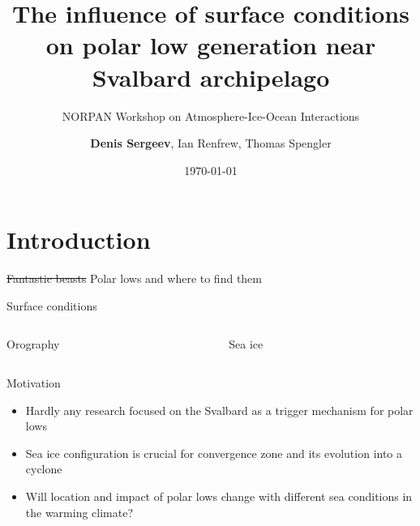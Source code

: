 \documentclass[10pt]{beamer}
\title{The influence of surface conditions on polar low generation near Svalbard archipelago}
\subtitle{\small{NORPAN Workshop on Atmosphere-Ice-Ocean Interactions}}
\date{\today}
\author{\textbf{Denis Sergeev}, Ian Renfrew, Thomas Spengler}
\begin{document}
\maketitle


\section{Introduction}
\begin{frame}{\sout{Fantastic beasts} Polar lows and where to find them}

\end{frame}

\begin{frame}{Surface conditions}
\begin{columns}
\begin{column}{0.5\textwidth}
Orography
\end{column}
\begin{column}{0.5\textwidth}
Sea ice
\end{column}
\end{columns}
\end{frame}

\begin{frame}{Motivation}
\begin{itemize}
\item
Hardly any research focused on the Svalbard as a trigger mechanism for polar lows
\item
Sea ice configuration is crucial for convergence zone and its evolution into a cyclone
\item
Will location and impact of polar lows change with different sea conditions in the warming climate?
\end{itemize}
\end{frame}
\end{document}
